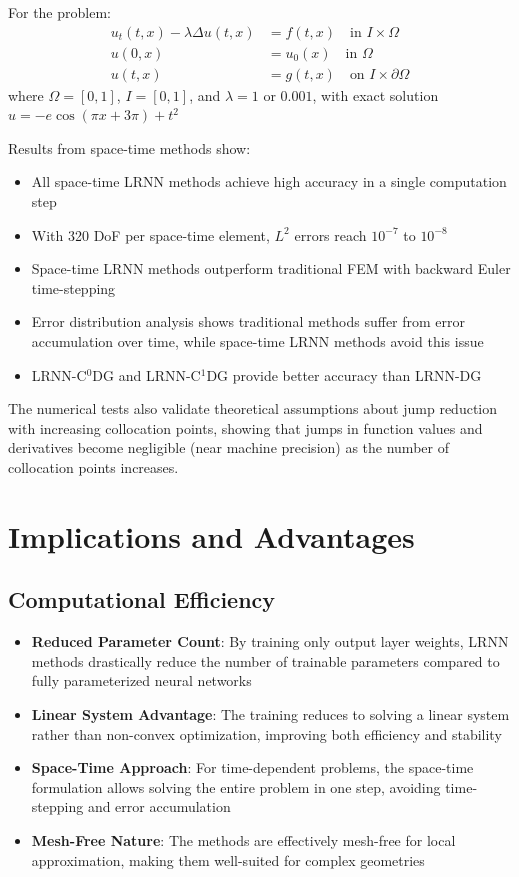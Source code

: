 \documentclass[11pt,a4paper]{article}
\begin{document}
For the problem:
\begin{align}
u_t(t,x) - \lambda \Delta u(t,x) &= f(t,x) \quad \text{in } I \times \Omega\\
u(0,x) &= u_0(x) \quad \text{in } \Omega\\
u(t,x) &= g(t,x) \quad \text{on } I \times \partial\Omega
\end{align}
where $\Omega = [0,1]$, $I = [0,1]$, and $\lambda = 1$ or $0.001$, with exact solution $u = -e\cos(\pi x + 3\pi) + t^2$

Results from space-time methods show:
\begin{itemize}
    \item All space-time LRNN methods achieve high accuracy in a single computation step
    \item With 320 DoF per space-time element, $L^2$ errors reach $10^{-7}$ to $10^{-8}$
    \item Space-time LRNN methods outperform traditional FEM with backward Euler time-stepping
    \item Error distribution analysis shows traditional methods suffer from error accumulation over time, while space-time LRNN methods avoid this issue
    \item LRNN-C$^0$DG and LRNN-C$^1$DG provide better accuracy than LRNN-DG
\end{itemize}

The numerical tests also validate theoretical assumptions about jump reduction with increasing collocation points, showing that jumps in function values and derivatives become negligible (near machine precision) as the number of collocation points increases.

\section{Implications and Advantages}

\subsection{Computational Efficiency}

\begin{itemize}
    \item \textbf{Reduced Parameter Count}: By training only output layer weights, LRNN methods drastically reduce the number of trainable parameters compared to fully parameterized neural networks
    
    \item \textbf{Linear System Advantage}: The training reduces to solving a linear system rather than non-convex optimization, improving both efficiency and stability
    
    \item \textbf{Space-Time Approach}: For time-dependent problems, the space-time formulation allows solving the entire problem in one step, avoiding time-stepping and error accumulation
    
    \item \textbf{Mesh-Free Nature}: The methods are effectively mesh-free for local approximation, making them well-suited for complex geometries
\end{itemize}
\end{document}
